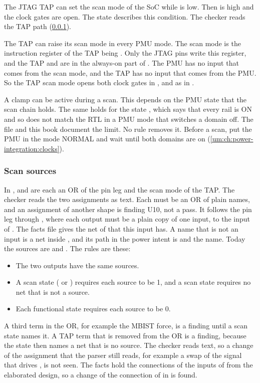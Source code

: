 The JTAG TAP can set the scan mode of the SoC while  is low. Then  is high and the clock gates are open. The state  describes this condition. The checker reads the TAP path (\cref{tm:pd:phase5-soc-upf:scan-sources}).

The TAP can raise its scan mode in every PMU mode. The scan mode is the instruction register of the TAP being . Only the JTAG pins write this register, and the TAP and  are in the always-on part of . The PMU has no input that comes from the scan mode, and the TAP has no input that comes from the PMU. So the TAP scan mode opens both clock gates in ,  and  as in .

A clamp can be active during a scan. This depends on the PMU state that the scan chain holds. The same holds for the state , which says that every rail is ON and so does not match the RTL in a PMU mode that switches a domain off. The file and this book document the limit. No rule removes it. Before a scan, put the PMU in the mode NORMAL and wait until both domains are on (\cref{um:ch:power-integration:clocks}).

\subsubsection{Scan sources}\label{tm:pd:phase5-soc-upf:scan-sources}
In ,  and  are each an OR of the pin leg and the scan mode of the TAP. The checker reads the two assignments as text. Each must be an OR of plain names, and an assignment of another shape is finding U10, not a pass. It follows the pin leg through , where each output must be a plain copy of one input, to the input of . The facts file gives the net of  that this input has. A name that is not an input is a net inside , and its path in the power intent is  and the name. Today the sources are  and . The rules are these:
\begin{itemize}
  \item The two outputs have the same sources.
  \item A scan state ( or ) requires each source to be 1, and a scan state requires no net that is not a source.
  \item Each functional state requires each source to be 0.
\end{itemize}
A third term in the OR, for example the MBIST force, is a finding until a scan state names it. A TAP term that is removed from the OR is a finding, because the state  then names a net that is no source. The checker reads text, so a change of the assignment that the parser still reads, for example a swap of the signal that drives , is not seen. The facts hold the connections of the inputs of  from the elaborated design, so a change of the connection of  in  is found.

